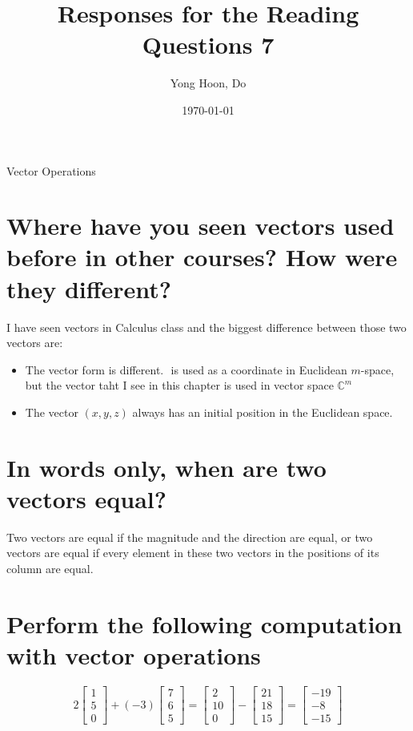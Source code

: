 \documentclass{article}
\title{Responses for the Reading Questions 7}
\author{Yong Hoon, Do}
\date{\today}
\begin{document}
\maketitle

\begin{center}
Vector Operations
\end{center}

\section{Where have you seen vectors used before in other courses? How were they different?}
I have seen vectors in Calculus class and the biggest difference between those two vectors are:
\begin{itemize}
  \item The vector form is different. \(<x,y,z>\) is used as a coordinate in Euclidean \(m\)-space, but the vector taht I see in this chapter is used in vector space \(\mathbb{C}^m\)
  \item The vector \((x,y,z)\) always has an initial position in the Euclidean space.
\end{itemize}

\section{In words only, when are two vectors equal?}
Two vectors are equal if the magnitude and the direction are equal, or
two vectors are equal if every element in these two vectors in the positions of its column are equal.

\section{Perform the following computation with vector operations}

\[
  2
    \begin{bmatrix}
      1 \\
      5 \\
      0
    \end{bmatrix}
  +
  (-3)
  \begin{bmatrix}
    7 \\
    6 \\
    5
  \end{bmatrix}
  =
  \begin{bmatrix}
    2 \\
    10 \\
    0
  \end{bmatrix}
  -
  \begin{bmatrix}
    21 \\
    18 \\
    15
  \end{bmatrix}
  =
  \begin{bmatrix}
    -19 \\
    -8 \\
    -15
  \end{bmatrix}
\]
\end{document}

